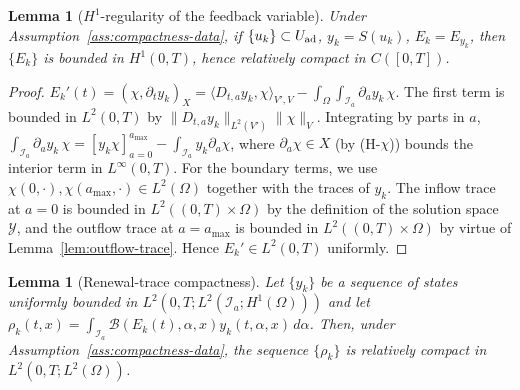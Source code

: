 \documentclass[pdflatex,sn-mathphys-num]{sn-jnl}
\theoremstyle{plain}
\newtheorem{lemma}[theorem]{Lemma}
\theoremstyle{definition}
\theoremstyle{remark}
\begin{document}
\begin{lemma}[$H^1$-regularity of the feedback variable]
\label{lem:Ek-H1}
Under Assumption~\ref{ass:compactness-data}, if $\{u_k\}\subset U_{\rm ad}$,
$y_k=S(u_k)$, $E_k=E_{y_k}$, then $\{E_k\}$ is bounded in $H^1(0,T)$, hence
relatively compact in $C([0,T])$.
\end{lemma}

\begin{proof}
$E_k'(t)=(\chi,\partial_t y_k)_X=\langle D_{t,a}y_k,\chi\rangle_{V',V}
-\int_\Omega\int_{\mathcal I_a}\partial_a y_k\,\chi$. The first term is bounded in
$L^2(0,T)$ by $\|D_{t,a}y_k\|_{L^2(V')}\|\chi\|_V$. Integrating by parts in
$a$, $\int_{\mathcal I_a}\partial_a y_k\,\chi=[y_k\chi]_{a=0}^{a_{\max}}
-\int_{\mathcal I_a} y_k\partial_a\chi$, where $\partial_a\chi\in X$ (by
(H-$\chi$)) bounds the interior term in $L^\infty(0,T)$. For the boundary
terms, we use $\chi(0,\cdot),\chi(a_{\max},\cdot)\in L^2(\Omega)$ together with the
traces of $y_k$. The inflow trace at $a=0$ is bounded in $L^2((0,T)\times\Omega)$ 
by the definition of the solution space $\mathcal Y$, and the outflow trace at 
$a=a_{\max}$ is bounded in $L^2((0,T)\times\Omega)$ by virtue of Lemma~\ref{lem:outflow-trace}. 
Hence $E_k'\in L^2(0,T)$ uniformly.
\end{proof}

\begin{lemma}[Renewal-trace compactness]
\label{lem:renewal-trace-compactness}
Let \(\{y_k\}\) be a sequence of states uniformly bounded in \(L^2(0,T; L^2(\mathcal I_a; H^1(\Omega)))\) and let \(\rho_k(t,x) = \int_{\mathcal I_a} \mathcal B(E_k(t), \alpha, x) y_k(t, \alpha, x) \, d\alpha\). Then, under Assumption~\ref{ass:compactness-data}, the sequence \(\{\rho_k\}\) is relatively compact in \(L^2(0,T; L^2(\Omega))\).
\end{lemma}
\end{document}

